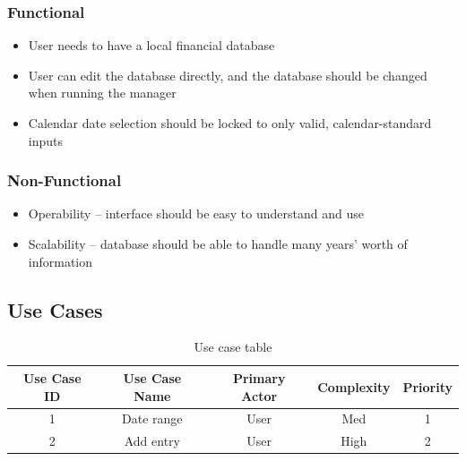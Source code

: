 \documentclass[10pt,conference,onecolumn,compsoc]{IEEEtran}
\begin{document}
\subsubsection{Functional}
\begin{itemize}
\item User needs to have a local financial database
\item User can edit the database directly, and the database should be changed when running the manager
\item Calendar date selection should be locked to only valid, calendar-standard inputs
\end{itemize}

\subsubsection{Non-Functional}
\begin{itemize}
\item Operability -- interface should be easy to understand and use
\item Scalability -- database should be able to handle many years' worth of information
\end{itemize}

\subsection{Use Cases}


\begin{table}
\centering
\begin{tabular}{|c|c|c|c|c|}
\hline
Use Case ID & Use Case Name & Primary Actor & Complexity & Priority \\
\hline \hline
1 & Date range & User & Med & 1\\
\hline
2 & Add entry & User & High & 2\\
\hline

\end{tabular}
\caption{Use case table}
\label{tab:useCaseIndex}
\end{table}
\end{document}
